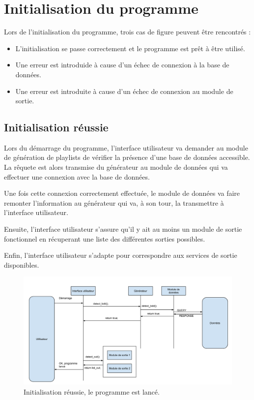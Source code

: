 
\section{Initialisation du programme}
\label{scenarii:init}
    
Lors de l'initialisation du programme, trois cas de figure peuvent être
rencontrés : 

\begin{itemize}
\item L'initialisation se passe correctement et le programme est prêt à être
utilisé.
\item Une erreur est introduide à cause d'un échec de connexion à la base de
données.
\item Une erreur est introduite à cause d'un échec de connexion au module de
sortie.
\end{itemize}

\subsection{Initialisation réussie}
\label{scenarii:init:reussie}

Lors du démarrage du programme, l'interface utilisateur va demander au 
module de génération de playlists de vérifier la présence d'une base de 
données accessible. La rêquete est alors transmise du générateur au module 
de données qui va effectuer une connexion avec la base de données.
        
Une fois cette connexion correctement effectuée, le module de données va 
faire remonter l'information au générateur qui va, à son tour, la 
transmettre à l'interface utilisateur.

Ensuite, l'interface utilisateur s'assure qu'il y ait au moins un module de 
sortie fonctionnel en récuperant une liste des différentes sorties possibles.

Enfin, l'interface utilisateur s'adapte pour correspondre aux services de 
sortie disponibles.
        
\begin{figure}[H]
\includegraphics[width=\textwidth]{data/scenarii/demarrage_fonctionnel.png}
\caption{Initialisation réussie, le programme est lancé.}          
\end{figure}
        
